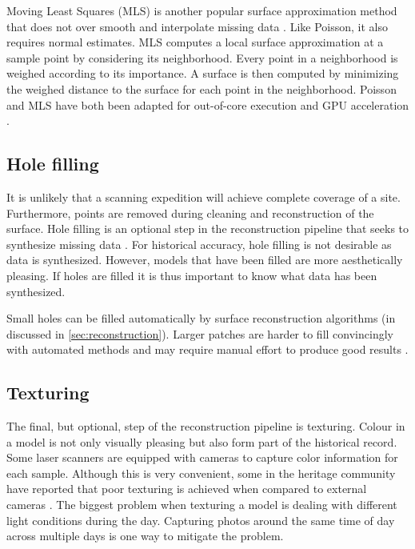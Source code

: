 Moving Least Squares (MLS) is another popular surface approximation method that does not over smooth and interpolate missing data \cite{Alexa2003}. Like Poisson, it also requires normal estimates. MLS computes a local surface approximation at a sample point by considering its neighborhood. Every point in a neighborhood is weighed according to its importance. A surface is then computed by minimizing the weighed distance to the surface for each point in the neighborhood. Poisson and MLS have both been adapted for out-of-core execution and GPU acceleration \cite{Merry2014}. \\


\subsection{Hole filling} \label{sec:filling}

It is unlikely that a scanning expedition will achieve complete coverage of a site. Furthermore, points are removed during cleaning and reconstruction of the surface. Hole filling is an optional step in the reconstruction pipeline that seeks to synthesize missing data \cite{Sharf2004} . For historical accuracy, hole filling is not desirable as data is synthesized. However, models that have been filled are more aesthetically pleasing. If holes are filled it is thus important to know what data has been synthesized.

Small holes can be filled automatically by surface reconstruction algorithms (in discussed in \ref{sec:reconstruction}). Larger patches are harder to fill convincingly with automated methods and may require manual effort to produce good results \cite{Ruther2011}.


\subsection{Texturing} \label{sec:texturing}

The final, but optional, step of the reconstruction pipeline is texturing. Colour in a model is not only visually pleasing but also form part of the historical record. Some laser scanners are equipped with cameras to capture color information for each sample. Although this is very convenient, some in the heritage community have reported that poor texturing is achieved when compared to external cameras \cite{Ruther2011}. The biggest problem when texturing a model is dealing with different light conditions during the day. Capturing photos around the same time of day across multiple days is one way to mitigate the problem.

